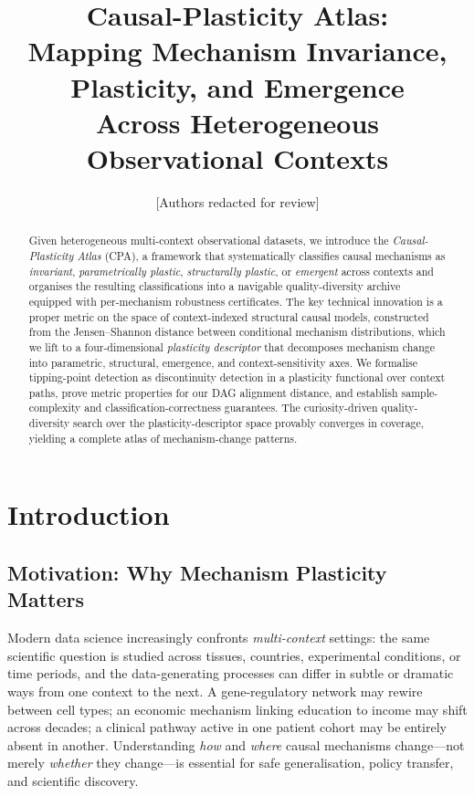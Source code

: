 \documentclass[11pt,a4paper]{article}
\title{%
  Causal-Plasticity Atlas:\\
  Mapping Mechanism Invariance, Plasticity, and Emergence\\
  Across Heterogeneous Observational Contexts%
}
\author{%
  [Authors redacted for review]
}
\date{}
\theoremstyle{definition}
\begin{document}
\maketitle

\begin{abstract}
Given heterogeneous multi-context observational datasets, we introduce the
\emph{Causal-Plasticity Atlas} (CPA), a framework that systematically
classifies causal mechanisms as \emph{invariant}, \emph{parametrically
plastic}, \emph{structurally plastic}, or \emph{emergent} across contexts
and organises the resulting classifications into a navigable
quality-diversity archive equipped with per-mechanism robustness
certificates.  The key technical innovation is a proper metric on the space
of context-indexed structural causal models, constructed from the
Jensen--Shannon distance between conditional mechanism distributions, which
we lift to a four-dimensional \emph{plasticity descriptor} that decomposes
mechanism change into parametric, structural, emergence, and
context-sensitivity axes.  We formalise tipping-point detection as
discontinuity detection in a plasticity functional over context paths,
prove metric properties for our DAG alignment distance, and establish
sample-complexity and classification-correctness guarantees.  The
curiosity-driven quality-diversity search over the plasticity-descriptor
space provably converges in coverage, yielding a complete atlas of
mechanism-change patterns.
\end{abstract}

\section{Introduction}\label{sec:intro}

\subsection{Motivation: Why Mechanism Plasticity Matters}

Modern data science increasingly confronts \emph{multi-context} settings:
the same scientific question is studied across tissues, countries,
experimental conditions, or time periods, and the data-generating processes
can differ in subtle or dramatic ways from one context to the next.
A gene-regulatory network may rewire between cell types; an economic
mechanism linking education to income may shift across decades; a clinical
pathway active in one patient cohort may be entirely absent in another.
Understanding \emph{how} and \emph{where} causal mechanisms change---not
merely \emph{whether} they change---is essential for safe generalisation,
policy transfer, and scientific discovery.
\end{document}
